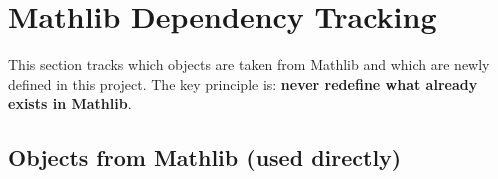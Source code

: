 ﻿\documentclass[12pt, a4paper]{article}
\renewcommand{\_}{\origunderscore\allowbreak}
\theoremstyle{definition}
\theoremstyle{plain}
\begin{document}
\section{Mathlib Dependency Tracking}

This section tracks which objects are taken from Mathlib and which are newly
defined in this project. The key principle is: \textbf{never redefine what
already exists in Mathlib}.

\subsection{Objects from Mathlib (used directly)}
\end{document}
